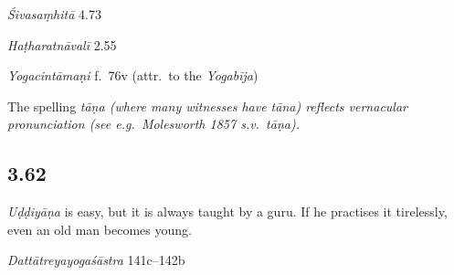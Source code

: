 \begin{ekdosis}
\begin{sources}[hp03_061]
\emph{Śivasaṃhitā} 4.73
\begin{versinnote}
\end{versinnote}
\end{sources}

\begin{testimonia}[hp03_061]
\emph{Haṭharatnāvalī} 2.55
\begin{versinnote}
\end{versinnote}

\emph{Yogacintāmaṇi} f.~76v (attr.~to the \emph{Yogabīja})
\begin{versinnote}
\end{versinnote}

\end{testimonia}

\begin{philcomm}[hp03_061]
The spelling \sl{tāṇa} (where many witnesses have \emph{tāna}) reflects vernacular pronunciation (see e.g.~Molesworth 1857 s.v.~\emph{tāṇa}). 
\end{philcomm}


\subsection*{3.62}
\begin{translation}[hp03_062]
\emph{Uḍḍiyāṇa} is easy, but it is always taught by a guru. If he practises it tirelessly, even an old man becomes young.%
\end{translation}

\begin{sources}[hp03_062]
\emph{Dattātreyayogaśāstra} 141c–142b
\begin{versinnote}
\tl{\var{141d guruṇā ] guṇaughāt \pi}\\!}
\end{versinnote}
\end{sources}


\end{ekdosis}

